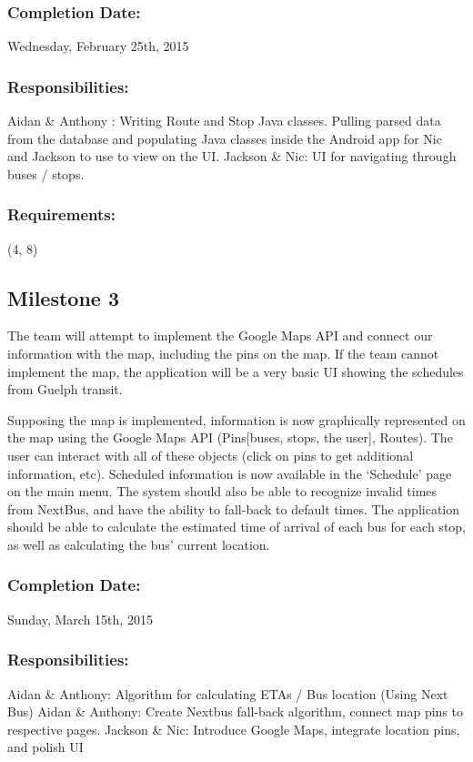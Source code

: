 \documentclass[a4paper,12pt]{article}
\begin{document}
\subsubsection{Completion Date:} Wednesday, February 25th, 2015
\subsubsection{Responsibilities:}
Aidan \& Anthony : Writing Route and Stop Java classes. Pulling parsed data from the database and populating Java classes inside the Android app for Nic and Jackson to use to view on the UI.
Jackson \& Nic: UI for navigating through buses / stops.
\subsubsection{Requirements:} (4, 8)

\subsection{Milestone 3}
The team will attempt to implement the Google Maps API and connect our information with the map, including the pins on the map. If the team cannot implement the map, the application will be a very basic UI showing the schedules from Guelph transit.

Supposing the map is implemented, information is now graphically represented on the map using the Google Maps API (Pins[buses, stops, the user], Routes). The user can interact with all of these objects (click on pins to get additional information, etc). Scheduled information is now available in the ‘Schedule’ page on the main menu. The system should also be able to recognize invalid times from NextBus, and have the ability to fall-back to default times. The application should be able to calculate the estimated time of arrival of each bus for each stop, as well as calculating the bus' current location.
\subsubsection{Completion Date:} Sunday, March 15th, 2015
\subsubsection{Responsibilities:}
Aidan \& Anthony: Algorithm for calculating ETAs / Bus location (Using Next Bus)
Aidan \& Anthony: Create Nextbus fall-back algorithm, connect map pins to respective pages. 
Jackson \& Nic: Introduce Google Maps, integrate location pins, and polish UI
\end{document}
